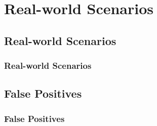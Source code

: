 \section{Real-world Scenarios}

\subsection{Real-world Scenarios}
\begin{frame}
	\frametitle{Real-world Scenarios}
\end{frame}

\subsection{False Positives}
\begin{frame}
	\frametitle{False Positives}
\end{frame}


